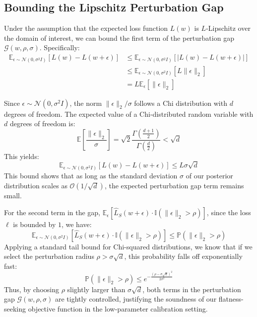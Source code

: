 \documentclass{article}
\theoremstyle{plain}
\theoremstyle{definition}
\theoremstyle{remark}
\begin{document}
\subsection{Bounding the Lipschitz Perturbation Gap}
Under the assumption that the expected loss function $L(w)$ is $L$-Lipschitz over the domain of interest, we can bound the first term of the perturbation gap $\mathcal{G}(w, \rho, \sigma)$. Specifically:
\begin{align}
    \mathbb{E}_{\epsilon \sim \mathcal{N}(0, \sigma^2 I)} [L(w) - L(w + \epsilon)] &\le \mathbb{E}_{\epsilon \sim \mathcal{N}(0, \sigma^2 I)} \left[ \left| L(w) - L(w + \epsilon) \right| \right] \nonumber \\
    &\le \mathbb{E}_{\epsilon \sim \mathcal{N}(0, \sigma^2 I)} \left[ L \|\epsilon\|_2 \right] \nonumber \\
    &= L \mathbb{E}_{\epsilon} [\|\epsilon\|_2]
\end{align}

Since $\epsilon \sim \mathcal{N}(0, \sigma^2 I)$, the norm $\|\epsilon\|_2 / \sigma$ follows a Chi distribution with $d$ degrees of freedom. The expected value of a Chi-distributed random variable with $d$ degrees of freedom is:
\begin{equation}
    \mathbb{E}\left[\frac{\|\epsilon\|_2}{\sigma}\right] = \sqrt{2} \frac{\Gamma\left(\frac{d+1}{2}\right)}{\Gamma\left(\frac{d}{2}\right)} < \sqrt{d}
\end{equation}
This yields:
\begin{equation}
    \mathbb{E}_{\epsilon \sim \mathcal{N}(0, \sigma^2 I)} [L(w) - L(w + \epsilon)] \le L \sigma \sqrt{d}
\end{equation}
This bound shows that as long as the standard deviation $\sigma$ of our posterior distribution scales as $\mathcal{O}(1/\sqrt{d})$, the expected perturbation gap term remains small. 

For the second term in the gap, $\mathbb{E}_{\epsilon} [\widehat{L}_S(w + \epsilon) \cdot \mathbb{I}(\|\epsilon\|_2 > \rho)]$, since the loss $\ell$ is bounded by $1$, we have:
\begin{equation}
    \mathbb{E}_{\epsilon \sim \mathcal{N}(0, \sigma^2 I)} [\widehat{L}_S(w + \epsilon) \cdot \mathbb{I}(\|\epsilon\|_2 > \rho)] \le \mathbb{P}(\|\epsilon\|_2 > \rho)
\end{equation}
Applying a standard tail bound for Chi-squared distributions, we know that if we select the perturbation radius $\rho > \sigma\sqrt{d}$, this probability falls off exponentially fast:
\begin{equation}
    \mathbb{P}(\|\epsilon\|_2 > \rho) \le e^{-\frac{(\rho - \sigma\sqrt{d})^2}{2\sigma^2}}
\end{equation}
Thus, by choosing $\rho$ slightly larger than $\sigma\sqrt{d}$, both terms in the perturbation gap $\mathcal{G}(w, \rho, \sigma)$ are tightly controlled, justifying the soundness of our flatness-seeking objective function in the low-parameter calibration setting.
\end{document}
